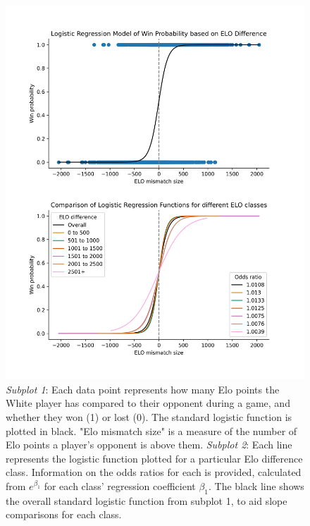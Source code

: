 \documentclass[10pt,a4paper]{article}
\begin{document}
\begin{multicols}{2}
\begin{figure}[p]
  \centering
  \includegraphics[width=\textwidth]{report/images/log_regression_dual.png}
  \caption{\textit{Subplot 1}: Each data point represents how many Elo points the White player has compared to their opponent during a game, and whether they won (1) or lost (0). The standard logistic function is plotted in black. "Elo mismatch size" is a measure of the number of Elo points a player's opponent is above them. \newline\newline
  \textit{Subplot 2}: Each line represents the logistic function plotted for a particular Elo difference class. Information on the odds ratios for each is provided, calculated from $e^{\beta_{1}}$ for each class' regression coefficient $\beta_{1}$. The black line shows the overall standard logistic function from subplot 1, to aid slope comparisons for each class.}
  \label{fds-project-template:fig:log_regression}
\end{figure}




\end{multicols}
\end{document}
